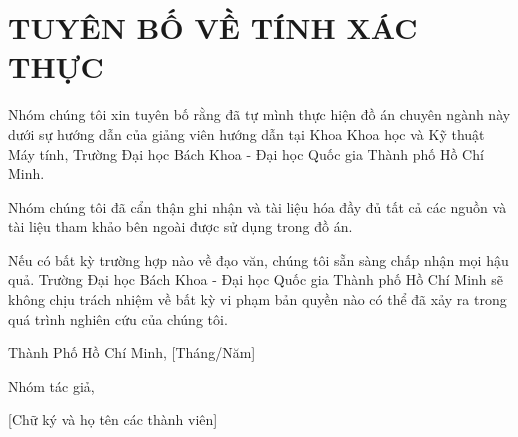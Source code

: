 \chapter*{TUYÊN BỐ VỀ TÍNH XÁC THỰC}

Nhóm chúng tôi xin tuyên bố rằng đã tự mình thực hiện đồ án chuyên ngành
này dưới sự hướng dẫn của giảng viên hướng dẫn tại Khoa Khoa học và Kỹ
thuật Máy tính, Trường Đại học Bách Khoa - Đại học Quốc gia Thành phố
Hồ Chí Minh.

Nhóm chúng tôi đã cẩn thận ghi nhận và tài liệu hóa đầy đủ tất cả các nguồn
và tài liệu tham khảo bên ngoài được sử dụng trong đồ án.

Nếu có bất kỳ trường hợp nào về đạo văn, chúng tôi sẵn sàng chấp nhận mọi hậu
quả. Trường Đại học Bách Khoa - Đại học Quốc gia Thành phố Hồ Chí Minh
sẽ không chịu trách nhiệm về bất kỳ vi phạm bản quyền nào có thể đã xảy ra
trong quá trình nghiên cứu của chúng tôi.

\vspace{2cm}

\begin{flushright}
Thành Phố Hồ Chí Minh, [Tháng/Năm]

Nhóm tác giả,

\vspace{1.5cm}

[Chữ ký và họ tên các thành viên]
\end{flushright}
